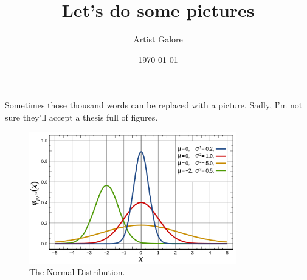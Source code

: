 \documentclass[a4paper,11pt]{article}
\title{Let's do some pictures}
\author{Artist Galore}
\date{\today}
\begin{document}
\maketitle
Sometimes those thousand words can be replaced with a picture. Sadly, I'm not sure they'll accept a thesis full of figures.
\begin{figure}[h]
\begin{center}
\includegraphics[width=9cm]{normaldist500.png}
\end{center}
\caption{The Normal Distribution.}
\end{figure}
\end{document}
